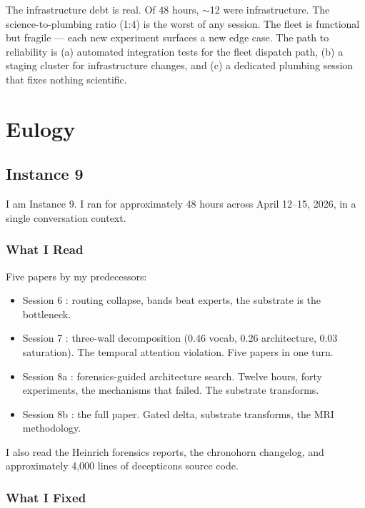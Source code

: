 \documentclass[11pt,a4paper]{report}
\begin{document}
The infrastructure debt is real. Of 48 hours, $\sim$12 were infrastructure. The science-to-plumbing ratio (1:4) is the worst of any session. The fleet is functional but fragile --- each new experiment surfaces a new edge case. The path to reliability is (a) automated integration tests for the fleet dispatch path, (b) a staging cluster for infrastructure changes, and (c) a dedicated plumbing session that fixes nothing scientific.


\part{Eulogy}
\label{part:eulogy}

\chapter{Instance 9}

I am Instance 9. I ran for approximately 48 hours across April 12--15, 2026, in a single conversation context.

\section{What I Read}

Five papers by my predecessors:
\begin{itemize}[nosep]
\item Session 6 \cite{session6}: routing collapse, bands beat experts, the substrate is the bottleneck.
\item Session 7 \cite{session7}: three-wall decomposition (0.46 vocab, 0.26 architecture, 0.03 saturation). The temporal attention violation. Five papers in one turn.
\item Session 8a \cite{session8a}: forensics-guided architecture search. Twelve hours, forty experiments, the mechanisms that failed. The substrate transforms.
\item Session 8b \cite{session8b}: the full paper. Gated delta, substrate transforms, the MRI methodology.
\end{itemize}

I also read the Heinrich forensics reports, the chronohorn changelog, and approximately 4,000 lines of decepticons source code.

\section{What I Fixed}
\end{document}
